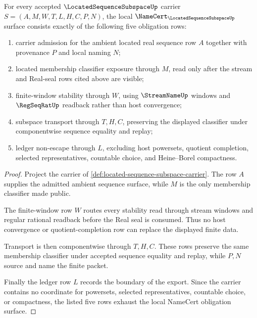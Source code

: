 \begin{theorem}
\label{thm:located-sequence-subspace-namecert-obligations}
For every accepted $\LocatedSequenceSubspaceUp$ carrier $S=(A,M,W,T,L,H,C,P,N)$, the local $\NameCert_{\LocatedSequenceSubspaceUp}$ surface consists exactly of the following five obligation rows:
\begin{enumerate}
\item carrier admission for the ambient located real sequence row $A$ together with provenance $P$ and local naming $N$;
\item located membership classifier exposure through $M$, read only after the stream and Real-seal rows cited above are visible;
\item finite-window stability through $W$, using $\StreamNameUp$ windows and $\RegSeqRatUp$ readback rather than host convergence;
\item subspace transport through $T,H,C$, preserving the displayed classifier under componentwise sequence equality and replay;
\item ledger non-escape through $L$, excluding host powersets, quotient completion, selected representatives, countable choice, and Heine--Borel compactness.
\end{enumerate}
\end{theorem}
\begin{proof}
Project the carrier of \autoref{def:located-sequence-subspace-carrier}. The row $A$ supplies the admitted ambient sequence surface, while $M$ is the only membership classifier made public.

The finite-window row $W$ routes every stability read through stream windows and regular rational readback before the Real seal is consumed. Thus no host convergence or quotient-completion row can replace the displayed finite data.

Transport is then componentwise through $T,H,C$. These rows preserve the same membership classifier under accepted sequence equality and replay, while $P,N$ source and name the finite packet.

Finally the ledger row $L$ records the boundary of the export. Since the carrier contains no coordinate for powersets, selected representatives, countable choice, or compactness, the listed five rows exhaust the local NameCert obligation surface.
\end{proof}


